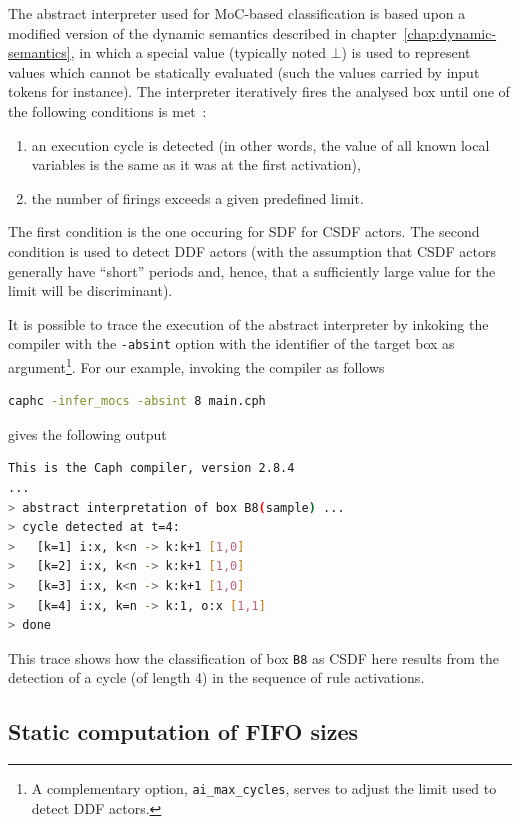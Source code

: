 The abstract interpreter used for MoC-based classification is based upon a modified version of
the dynamic semantics described in chapter~\ref{chap:dynamic-semantics}, in which a special value 
(typically noted $\bot$) is used to represent values which cannot be statically evaluated (such
the values carried by input tokens for instance). The interpreter iteratively fires the analysed box 
until one of the following conditions is met~:
  \begin{enumerate}
  \item an execution cycle is detected (in other words, the value of all known local variables is
    the same as it was at the first activation),
  \item the number of firings exceeds a given predefined limit.
  \end{enumerate}
The first condition is the one occuring for SDF for CSDF actors. The second condition is used to
detect DDF actors (with the assumption that CSDF actors generally have ``short'' periods and, hence,
that a sufficiently large value for the limit will be discriminant).  

It is possible to trace the execution of the abstract interpreter by inkoking the compiler with the
\verb|-absint| option with the identifier of the target box as argument\footnote{A complementary
  option, \texttt{ai\_max\_cycles}, serves to adjust the limit used to detect DDF actors.}. For our example, invoking the
compiler as follows

\begin{lstlisting}[language=bash]
caphc -infer_mocs -absint 8 main.cph
\end{lstlisting}

\noindent
gives the following output 

\begin{lstlisting}[language=bash,basicstyle=\small]
This is the Caph compiler, version 2.8.4
...
> abstract interpretation of box B8(sample) ...
> cycle detected at t=4:
>   [k=1] i:x, k<n -> k:k+1 [1,0]
>   [k=2] i:x, k<n -> k:k+1 [1,0]
>   [k=3] i:x, k<n -> k:k+1 [1,0]
>   [k=4] i:x, k=n -> k:1, o:x [1,1]
> done
\end{lstlisting}

This trace shows how the classification of box \verb|B8| as CSDF here results from the detection of
a cycle (of length 4) in the sequence of rule activations.

\subsection{Static computation of FIFO sizes}
\label{sec:stat-comp-fifo}

